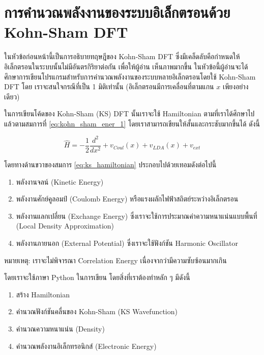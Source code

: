 \section{การคำนวณพลังงานของระบบอิเล็กตรอนด้วย Kohn-Sham DFT}
\label{sec:calc_ener_kohn_sham}

ในหัวข้อก่อนหน้านี้เป็นการอธิบายทฤษฎีของ Kohn-Sham DFT ซึ่งมีเคล็ดลับคือกำหนดให้อิเล็กตรอนในระบบนั้นไม่มีอันตรกิริยาต่อกัน เพื่อให้ผู้อ่าน%
เห็นภาพมากขึ้น ในหัวข้อนี้ผู้อ่านจะได้ศึกษาการเขียนโปรแกรมสำหรับการคำนวณพลังงานของระบบหลายอิเล็กตรอนโดยใช้ Kohn-Sham DFT โดย%
เราจะสนใจกรณีที่เป็น 1 มิติเท่านั้น (อิเล็กตรอนมีการเคลื่อนที่ตามแกน $x$ เพียงอย่างเดียว)

ในการเขียนโค้ดของ Kohn-Sham (KS) DFT นั้นเราจะใช้ Hamiltonian ตามที่เราได้ศึกษาไปแล้วตามสมการที่ \eqref{eq:kohn_sham_ener_1}
โดยเราสามารถเขียนให้สั้นและกระชับมากขึ้นได้ ดังนี้

\begin{equation}\label{eq:ks_hamiltonian}
    \hat{H} = -\frac{1}{2} \frac{d^2}{dx^2} + v_{Coul}(x) + v_{LDA}(x) + v_{ext}
\end{equation}

\noindent โดยทางด้านขวาของสมการ \eqref{eq:ks_hamiltonian} ประกอบไปด้วยเทอมดังต่อไปนี้
%
\begin{enumerate}[topsep=0pt,noitemsep]\setlength\itemsep{0.5em}
    \item พลังงานจลน์ (Kinetic Energy)

    \item พลังงานศักย์คูลอมป์ (Coulomb Energy) หรือแรงผลักไฟฟ้าสถิตย์ระหว่างอิเล็กตรอน

    \item พลังงานแลกเปลี่ยน (Exchange Energy) ซึ่งเราจะใช้การประมาณค่าความหนาแน่นแบบพื้นที่ (Local Density Approximation)

    \item พลังงานภายนอก (External Potential) ซึ่งเราจะใช้ฟังก์ชัน Harmonic Oscillator
\end{enumerate}

\noindent หมายเหตุ: เราจะไม่พิจารณา Correlation Energy เนื่องจากว่ามีความซับซ้อนมากเกิน

โดยเราจะใช้ภาษา Python ในการเขียน โดยสิ่งที่เราต้องทำหลัก ๆ มีดังนี้
%
\begin{enumerate}[topsep=0pt,noitemsep]\setlength\itemsep{0.5em}
    \item สร้าง Hamiltonian

    \item คำนวณฟังก์ชันคลื่นของ Kohn-Sham (KS Wavefunction)

    \item คำนวณความหนาแน่น (Density)

    \item คำนวณพลังงานอิเล็กทรอนิกส์ (Electronic Energy)
\end{enumerate}

